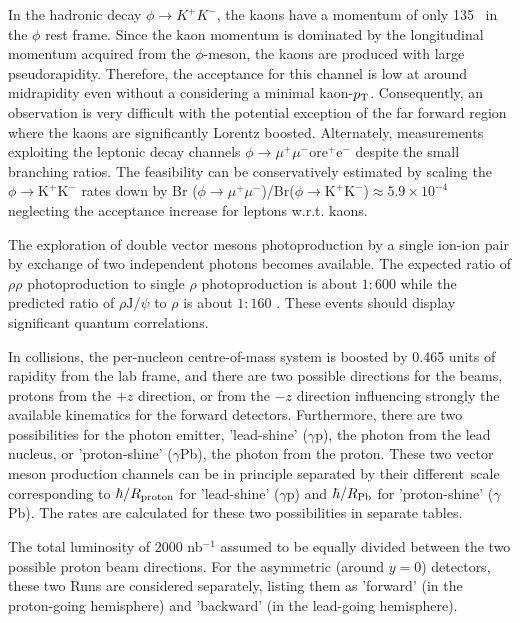 \documentclass[../report.tex]{subfiles}
\begin{document}
In the hadronic decay $\phi \rightarrow K^+K^-$, the kaons have a momentum of only 135 \UMeVc\ in the $\phi$ rest frame. Since the kaon momentum is dominated by the longitudinal momentum acquired from the $\phi$-meson, the kaons are produced with large pseudorapidity. Therefore, the acceptance for this channel is low at around midrapidity even without a considering a minimal kaon-$p\sb{\scriptstyle\mathrm{T}}$.   Consequently, an observation is very difficult with the potential exception of the far forward region where the kaons are significantly Lorentz boosted.  Alternately, measurements exploiting the leptonic decay channels $\phi \rightarrow \mu^+ \mu^- \mathrm{or} \mathrm{e}^+ \mathrm{e}^-$ despite the small branching ratios. The feasibility can be conservatively estimated by scaling the $\phi\rightarrow \mathrm{K}^+\mathrm{K}^-$ rates down by Br ($\phi \rightarrow \mu^+ \mu^-$)/Br($\phi \rightarrow \mathrm{K}^+\mathrm{K}^-$)$\approx 5.9 \times 10^{-4}$ neglecting the acceptance increase for leptons w.r.t. kaons. 

The exploration of double vector mesons photoproduction by a single ion-ion pair by exchange of two independent photons becomes available.   The expected ratio of $\rho\rho$ photoproduction to single $\rho$ photoproduction is about $1:600$ while the predicted ratio of $\rho \mathrm{J/}\psi$ to $\rho$ is about $1:160$ \cite{Klein:1999qj}.  
These events should display significant quantum correlations.  

In \pPb collisions, the per-nucleon centre-of-mass system is boosted by 0.465 units of rapidity from the lab frame, and there are two possible directions for the beams, protons from the $+z$ direction, or from the $-z$ direction influencing strongly the available kinematics for the forward detectors.  Furthermore, there are two possibilities for the photon emitter, 'lead-shine' ($\gamma$p), the photon from the lead nucleus, or 'proton-shine' ($\gamma$Pb), the photon from the proton. These two vector meson production channels can be in principle separated by their different~\pT scale corresponding to $\hbar/R_{\rm proton}$ for 'lead-shine' ($\gamma$p) and $\hbar/R_{\rm Pb}$ for 'proton-shine' ($\gamma$Pb).   %
The rates are calculated for these two possibilities in separate tables.

The total \pPb luminosity of 2000 nb$^{-1}$ assumed to be equally divided between the two possible proton beam directions.  For the asymmetric (around $y=0$) detectors, these two Runs are considered separately, listing them as 'forward' (in the proton-going hemisphere) and 'backward' (in the lead-going hemisphere).  
\end{document}
